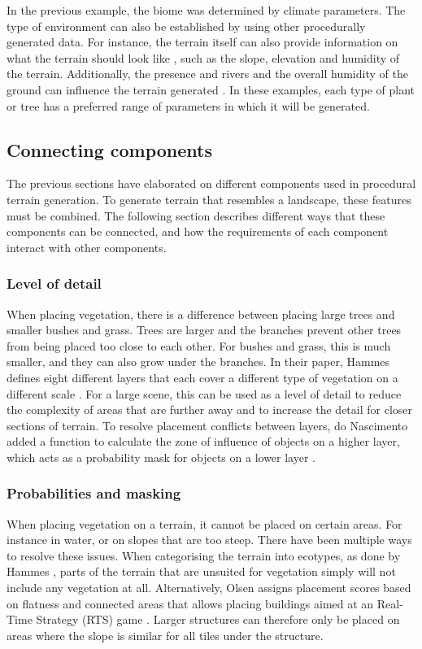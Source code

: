 \documentclass{article}
\begin{document}
In the previous example, the biome was determined by climate parameters. The type of environment can also be established by using other procedurally generated data. For instance, the terrain itself can also provide information on what the terrain should look like \cite{hammes_modeling_2001}, such as the slope, elevation and humidity of the terrain. Additionally, the presence and rivers and the overall humidity of the ground can influence the terrain generated \cite{do_nascimento_gpu-based_2018} \cite{van_muijden_gpu-based_2017}. In these examples, each type of plant or tree has a preferred range of parameters in which it will be generated.

\subsection{Connecting components}
The previous sections have elaborated on different components used in procedural terrain generation. To generate terrain that resembles a landscape, these features must be combined. The following section describes different ways that these components can be connected, and how the requirements of each component interact with other components.

\subsubsection{Level of detail}
When placing vegetation, there is a difference between placing large trees and smaller bushes and grass. Trees are larger and the branches prevent other trees from being placed too close to each other. For bushes and grass, this is much smaller, and they can also grow under the branches. In their paper, Hammes defines eight different layers that each cover a different type of vegetation on a different scale \cite{hammes_modeling_2001}. For a large scene, this can be used as a level of detail to reduce the complexity of areas that are further away and to increase the detail for closer sections of terrain. To resolve placement conflicts between layers, do Nascimento added a function to calculate the zone of influence of objects on a higher layer, which acts as a probability mask for objects on a lower layer \cite{do_nascimento_gpu-based_2018}.

\subsubsection{Probabilities and masking}
When placing vegetation on a terrain, it cannot be placed on certain areas. For instance in water, or on slopes that are too steep. There have been multiple ways to resolve these issues. When categorising the terrain into ecotypes, as done by Hammes \cite{hammes_modeling_2001}, parts of the terrain that are unsuited for vegetation simply will not include any vegetation at all. Alternatively, Olsen assigns placement scores based on flatness and connected areas that allows placing buildings aimed at an Real-Time Strategy (RTS) game \cite{olsen_realtime_2004}. Larger structures can therefore only be placed on areas where the slope is similar for all tiles under the structure.
\end{document}
